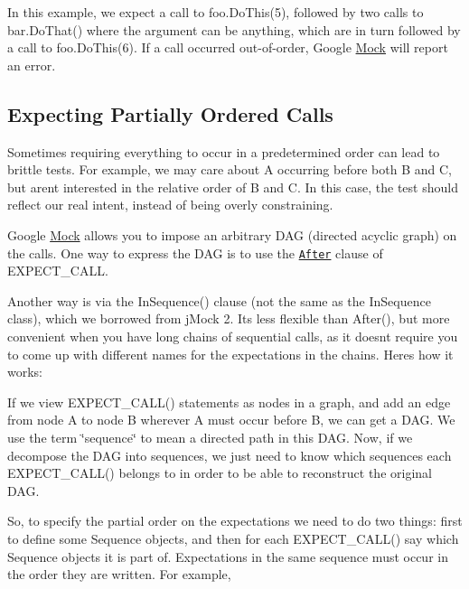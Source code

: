 In this example, we expect a call to {\ttfamily foo.\+Do\+This(5)}, followed by two calls to {\ttfamily bar.\+Do\+That()} where the argument can be anything, which are in turn followed by a call to {\ttfamily foo.\+Do\+This(6)}. If a call occurred out-\/of-\/order, Google \hyperlink{classMock}{Mock} will report an error.

\subsection*{Expecting Partially Ordered Calls}

Sometimes requiring everything to occur in a predetermined order can lead to brittle tests. For example, we may care about {\ttfamily A} occurring before both {\ttfamily B} and {\ttfamily C}, but aren\textquotesingle{}t interested in the relative order of {\ttfamily B} and {\ttfamily C}. In this case, the test should reflect our real intent, instead of being overly constraining.

Google \hyperlink{classMock}{Mock} allows you to impose an arbitrary D\+AG (directed acyclic graph) on the calls. One way to express the D\+AG is to use the \href{CheatSheet.md#the-after-clause}{\tt After} clause of {\ttfamily E\+X\+P\+E\+C\+T\+\_\+\+C\+A\+LL}.

Another way is via the {\ttfamily In\+Sequence()} clause (not the same as the {\ttfamily In\+Sequence} class), which we borrowed from j\+Mock 2. It\textquotesingle{}s less flexible than {\ttfamily After()}, but more convenient when you have long chains of sequential calls, as it doesn\textquotesingle{}t require you to come up with different names for the expectations in the chains. Here\textquotesingle{}s how it works\+:

If we view {\ttfamily E\+X\+P\+E\+C\+T\+\_\+\+C\+A\+L\+L()} statements as nodes in a graph, and add an edge from node A to node B wherever A must occur before B, we can get a D\+AG. We use the term \char`\"{}sequence\char`\"{} to mean a directed path in this D\+AG. Now, if we decompose the D\+AG into sequences, we just need to know which sequences each {\ttfamily E\+X\+P\+E\+C\+T\+\_\+\+C\+A\+L\+L()} belongs to in order to be able to reconstruct the original D\+AG.

So, to specify the partial order on the expectations we need to do two things\+: first to define some {\ttfamily Sequence} objects, and then for each {\ttfamily E\+X\+P\+E\+C\+T\+\_\+\+C\+A\+L\+L()} say which {\ttfamily Sequence} objects it is part of. Expectations in the same sequence must occur in the order they are written. For example,


